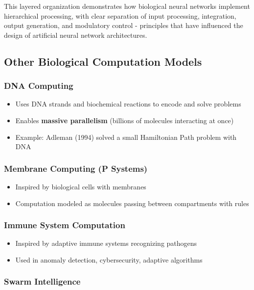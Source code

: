 This layered organization demonstrates how biological neural networks implement hierarchical processing, with clear separation of input processing, integration, output generation, and modulatory control - principles that have influenced the design of artificial neural network architectures.

\subsection{Other Biological Computation Models}

\subsubsection{DNA Computing}

\begin{itemize}
\item Uses DNA strands and biochemical reactions to encode and solve problems
\item Enables \textbf{massive parallelism} (billions of molecules interacting at once)
\item Example: Adleman (1994) solved a small Hamiltonian Path problem with DNA
\end{itemize}

\subsubsection{Membrane Computing (P Systems)}

\begin{itemize}
\item Inspired by biological cells with membranes
\item Computation modeled as molecules passing between compartments with rules
\end{itemize}

\subsubsection{Immune System Computation}

\begin{itemize}
\item Inspired by adaptive immune systems recognizing pathogens
\item Used in anomaly detection, cybersecurity, adaptive algorithms
\end{itemize}

\subsubsection{Swarm Intelligence}

